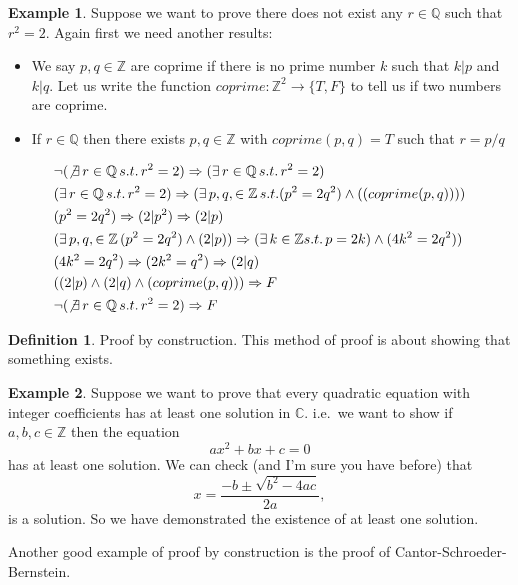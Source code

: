\documentclass[
]{book}
\theoremstyle{definition}
\newtheorem{definition}{Definition}[chapter]
\theoremstyle{definition}
\newtheorem{example}{Example}[chapter]
\theoremstyle{definition}
\theoremstyle{definition}
\theoremstyle{remark}
\begin{document}
\begin{example}
Suppose we want to prove there does not exist any \(r \in \mathbb{Q}\) such that \(r^2=2\).
Again first we need another results:

\begin{itemize}
\item
  We say \(p,q \in \mathbb{Z}\) are coprime if there is no prime number \(k\) such that \(k|p\) and \(k|q\). Let us write the function \(coprime: \mathbb{Z}^2 \rightarrow \{T,F\}\) to tell us if two numbers are coprime.
\item
  If \(r \in \mathbb{Q}\) then there exists \(p,q \in \mathbb{Z}\) with \(coprime(p,q) =T\) such that \(r=p/q\)
\end{itemize}

\begin{align*}
&\neg(\not\exists \, r \in \mathbb{Q} \, s.t. \, r^2 =2) \Rightarrow (\exists \, r \in \mathbb{Q} \, s.t. \, r^2 = 2)\\
&(\exists \, r \in \mathbb{Q} \, s.t. \, r^2 = 2) \Rightarrow (\exists \, p, q, \in \mathbb{Z} \, s.t. (p^2 = 2 q^2)\wedge((coprime(p,q)))) \\
&( p^2 = 2 q^2)  \Rightarrow (2|p^2) \Rightarrow (2|p) \\
& (\exists \, p, q, \in \mathbb{Z} \, (p^2 = 2 q^2)\wedge(2|p)) \Rightarrow (\exists \, k \in \mathbb{Z} s.t.\, p=2k)\wedge(4k^2=2q^2) )\\
&(4k^2=2q^2) \Rightarrow (2k^2 = q^2) \Rightarrow (2|q)\\
&((2|p)\wedge(2|q)\wedge (coprime(p,q))) \Rightarrow F\\
&\neg(\not\exists \, r \in \mathbb{Q} \, s.t. \, r^2 =2) \Rightarrow F
\end{align*}
\end{example}

\begin{definition}
Proof by construction. This method of proof is about showing that something exists.
\end{definition}

\begin{example}
Suppose we want to prove that every quadratic equation with integer coefficients has at least one solution in \(\mathbb{C}\). i.e.~we want to show if \(a,b,c \in \mathbb{Z}\) then the equation \[ ax^2+bx+c = 0 \] has at least one solution. We can check (and I'm sure you have before) that
\[ x = \frac{-b\pm \sqrt{b^2-4ac}}{2a},  \] is a solution. So we have demonstrated the existence of at least one solution.

Another good example of proof by construction is the proof of Cantor-Schroeder-Bernstein.
\end{example}
\end{document}
